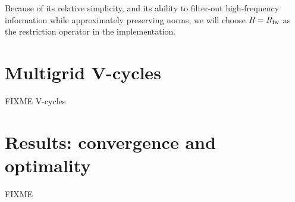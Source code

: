 \documentclass[letterpaper,final,12pt,reqno]{amsart}
\begin{document}
Because of its relative simplicity, and its ability to filter-out high-frequency information while approximately preserving norms, we will choose $R=R_{\text{fw}}$ as the restriction operator in the implementation.


\section{Multigrid V-cycles}

FIXME V-cycles


\section{Results: convergence and optimality}

FIXME


\small

\bigskip


\end{document}
